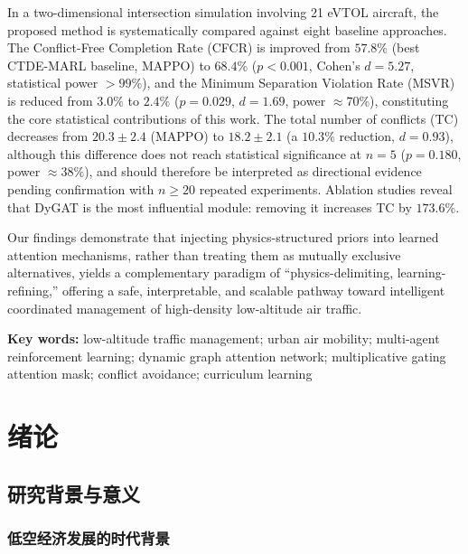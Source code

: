\documentclass[12pt,a4paper,UTF8]{ctexbook}
\begin{document}
In a two-dimensional intersection simulation involving 21 eVTOL aircraft, the proposed method is systematically compared against eight baseline approaches. The Conflict-Free Completion Rate (CFCR) is improved from $57.8\%$ (best CTDE-MARL baseline, MAPPO) to $68.4\%$ ($p<0.001$, Cohen's $d=5.27$, statistical power $>99\%$), and the Minimum Separation Violation Rate (MSVR) is reduced from $3.0\%$ to $2.4\%$ ($p=0.029$, $d=1.69$, power $\approx70\%$), constituting the core statistical contributions of this work. The total number of conflicts (TC) decreases from $20.3\pm2.4$ (MAPPO) to $18.2\pm2.1$ (a $10.3\%$ reduction, $d=0.93$), although this difference does not reach statistical significance at $n=5$ ($p=0.180$, power $\approx38\%$), and should therefore be interpreted as directional evidence pending confirmation with $n\geq20$ repeated experiments. Ablation studies reveal that DyGAT is the most influential module: removing it increases TC by $173.6\%$.

Our findings demonstrate that injecting physics-structured priors into learned attention mechanisms, rather than treating them as mutually exclusive alternatives, yields a complementary paradigm of ``physics-delimiting, learning-refining,'' offering a safe, interpretable, and scalable pathway toward intelligent coordinated management of high-density low-altitude air traffic.

\noindent\textbf{Key words: }low-altitude traffic management; urban air mobility; multi-agent reinforcement learning; dynamic graph attention network; multiplicative gating attention mask; conflict avoidance; curriculum learning

\tableofcontents
\newpage

\chapter{绪论}

\section{研究背景与意义}

\subsection{低空经济发展的时代背景}
\end{document}
